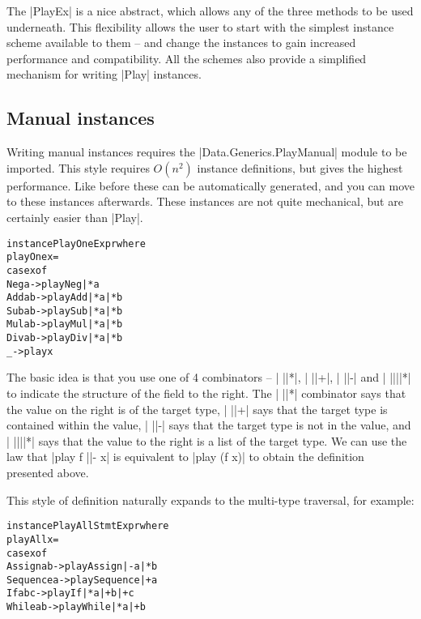 \documentclass[preprint]{sigplanconf}
\newenvironment{code}{\begin{alltt}\small}{\end{alltt}}
\begin{document}
The |PlayEx| is a nice abstract, which allows any of the three methods to be used underneath. This flexibility allows the user to start with the simplest instance scheme available to them -- and change the instances to gain increased performance and compatibility. All the schemes also provide a simplified mechanism for writing |Play| instances.

\subsection{Manual instances}

Writing manual instances requires the |Data.Generics.PlayManual| module to be imported. This style requires $O(n^2)$ instance definitions, but gives the highest performance. Like before these can be automatically generated, and you can move to these instances afterwards. These instances are not quite mechanical, but are certainly easier than |Play|.

\begin{code}
instance PlayOne Expr where
    playOne x =
        case x of
            Neg  a    -> play Neg  |* a
            Add  a b  -> play Add  |* a |* b
            Sub  a b  -> play Sub  |* a |* b
            Mul  a b  -> play Mul  |* a |* b
            Div  a b  -> play Div  |* a |* b
            _         -> play x
\end{code}

The basic idea is that you use one of 4 combinators -- | ||*|, | ||+|, | ||-| and | ||||*| to indicate the structure of the field to the right. The | ||*| combinator says that the value on the right is of the target type, | ||+| says that the target type is contained within the value, | ||-| says that the target type is not in the value, and | ||||*| says that the value to the right is a list of the target type. We can use the law that |play f ||- x| is equivalent to |play (f x)| to obtain the definition presented above.

This style of definition naturally expands to the multi-type traversal, for example:

\begin{code}
instance PlayAll Stmt Expr where
    playAll x =
        case x of
            Assign    a b    -> play Assign    |-  a |*  b
            Sequence  a      -> play Sequence  |+  a
            If        a b c  -> play If        |*  a |+  b |+ c
            While     a b    -> play While     |*  a |+  b
\end{code}
\end{document}
